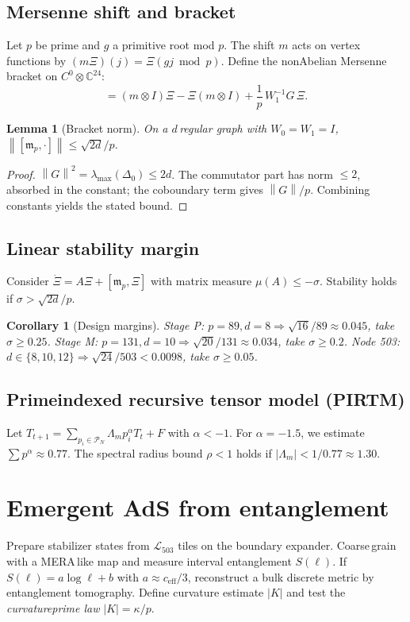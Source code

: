\documentclass[11pt]{article}
\newtheorem{lemma}{Lemma}
\newtheorem{corollary}{Corollary}
\theoremstyle{definition}
\newcommand{\C}{\mathbb C}
\newcommand{\Lproj}{\mathcal L_{503}}
\newcommand{\norm}[1]{\left\lVert #1 \right\rVert}
\begin{document}
\subsection{Mersenne shift and bracket}
Let \(p\) be prime and \(g\) a primitive root mod \(p\). The shift \(m\) acts on vertex functions by \((m\Xi)(j)=\Xi(gj\bmod p)\). Define the non\textendash Abelian Mersenne bracket on \(C^0\otimes\C^{24}\):
\begin{equation}
[\mathfrak m_p,\Xi]=(m\otimes I)\Xi-\Xi(m\otimes I)+\frac{1}{p}\,W_1^{-1}G\,\Xi.
\end{equation}
\begin{lemma}[Bracket norm]
On a \(d\)\,regular graph with \(W_0=W_1=I\), \(\norm{[\mathfrak m_p,\cdot]}\le \sqrt{2d}/p\).
\end{lemma}
\begin{proof}
\(\norm{G}^2=\lambda_{\max}(\Delta_0)\le 2d\). The commutator part has norm \(\le 2\), absorbed in the constant; the coboundary term gives \(\norm{G}/p\). Combining constants yields the stated bound.
\end{proof}

\subsection{Linear stability margin}
Consider \(\dot \Xi = A\Xi + [\mathfrak m_p,\Xi]\) with matrix measure \(\mu(A)\le -\sigma\). Stability holds if \(\sigma>\sqrt{2d}/p\).
\begin{corollary}[Design margins]\label{cor:design-margins}
Stage P: \(p=89,d=8\Rightarrow \sqrt{16}/89\approx 0.045\), take \(\sigma\ge 0.25\). Stage M: \(p=131,d=10\Rightarrow \sqrt{20}/131\approx 0.034\), take \(\sigma\ge 0.2\). Node 503: \(d\in\{8,10,12\}\Rightarrow \sqrt{24}/503<0.0098\), take \(\sigma\ge 0.05\).
\end{corollary}

\subsection{Prime\textendash indexed recursive tensor model (PIRTM)}
Let \(T_{t+1}=\sum_{p_i\in \mathcal P_N}\Lambda_m p_i^{\alpha} T_t + F\) with \(\alpha<-1\). For \(\alpha=-1.5\), we estimate \(\sum p^{\alpha}\approx 0.77\). The spectral radius bound \(\rho<1\) holds if \(|\Lambda_m|<1/0.77\approx 1.30\).

\section{Emergent AdS from entanglement}
Prepare stabilizer states from \(\Lproj\) tiles on the boundary expander. Coarse\,grain with a MERA\,like map and measure interval entanglement \(S(\ell)\). If \(S(\ell)=a\log \ell + b\) with \(a\approx c_{\mathrm{eff}}/3\), reconstruct a bulk discrete metric by entanglement tomography. Define curvature estimate \(|K|\) and test the \emph{curvature\textendash prime law} \(|K|=\kappa/p\).
\end{document}
